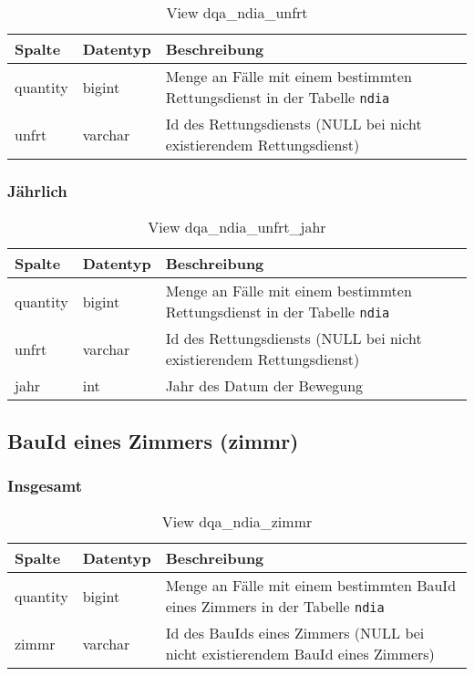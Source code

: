 \begin{table}[ht]
	\centering   
	\caption{View dqa\_ndia\_unfrt}
	\label{tab:bewUnfrtI}
	\begin{tabular}{||l|l|p{10cm}||}   		
		\hline
		Spalte & Datentyp & Beschreibung \\ [0.5ex]
		\hline\hline
		quantity & bigint & Menge an Fälle mit einem bestimmten Rettungsdienst in der Tabelle \texttt{ndia} \\
		\hline
		unfrt & varchar & Id des Rettungsdiensts (NULL bei nicht existierendem Rettungsdienst)\\
		\hline
	\end{tabular}
\end{table}

\subsubsection{Jährlich} \label{subsubsec:bewUnfrtJ}

\begin{table}[ht]
	\centering   
	\caption{View dqa\_ndia\_unfrt\_jahr}
	\label{tab:bewUnfrtJ}
	\begin{tabular}{||l|l|p{10cm}||}
		\hline
		Spalte & Datentyp & Beschreibung \\ [0.5ex]
		\hline\hline
		quantity & bigint & Menge an Fälle mit einem bestimmten Rettungsdienst in der Tabelle \texttt{ndia}\\
		\hline
		unfrt & varchar & Id des Rettungsdiensts (NULL bei nicht existierendem Rettungsdienst)\\
		\hline
		jahr & int &  Jahr des Datum der Bewegung \\
		\hline		
	\end{tabular}
\end{table}

\subsection{BauId eines Zimmers (zimmr)} \label{subsec:bewZimmr}

\subsubsection{Insgesamt} \label{subsubsec:bewZimmrI}

\begin{table}[ht]
	\centering   
	\caption{View dqa\_ndia\_zimmr}
	\label{tab:bewZimmrI}
	\begin{tabular}{||l|l|p{10cm}||}   		
		\hline
		Spalte & Datentyp & Beschreibung \\ [0.5ex]
		\hline\hline
		quantity & bigint & Menge an Fälle mit einem bestimmten BauId eines Zimmers in der Tabelle \texttt{ndia} \\
		\hline
		zimmr & varchar & Id des BauIds eines Zimmers (NULL bei nicht existierendem BauId eines Zimmers)\\
		\hline
	\end{tabular}
\end{table}

